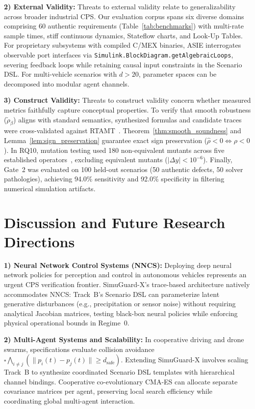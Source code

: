 \documentclass[journal]{IEEEtran}
\begin{document}
\noindent\textbf{2) External Validity:}
Threats to external validity relate to generalizability across broader industrial CPS. Our evaluation corpus spans six diverse domains comprising 60 authentic requirements (Table~\ref{tab:benchmarks}) with multi-rate sample times, stiff continuous dynamics, Stateflow charts, and Look-Up Tables. For proprietary subsystems with compiled C/MEX binaries, ASIE interrogates observable port interfaces via \texttt{Simulink.BlockDiagram.getAlgebraicLoops}, severing feedback loops while retaining causal input constraints in the Scenario DSL. For multi-vehicle scenarios with $d > 20$, parameter spaces can be decomposed into modular agent channels.

\noindent\textbf{3) Construct Validity:}
Threats to construct validity concern whether measured metrics faithfully capture conceptual properties. To verify that smooth robustness ($\tilde{\rho}_\beta$) aligns with standard semantics, synthesized formulas and candidate traces were cross-validated against RTAMT~\cite{nickovic2020rtamt}. Theorem~\ref{thm:smooth_soundness} and Lemma~\ref{lem:sign_preservation} guarantee exact sign preservation ($\hat{\rho} < 0 \iff \rho < 0$). In RQ10, mutation testing used 180 non-equivalent mutants across five established operators~\cite{zhan2005mutation}, excluding equivalent mutants ($|\Delta y| < 10^{-6}$). Finally, Gate~2 was evaluated on 100 held-out scenarios (50 authentic defects, 50 solver pathologies), achieving 94.0\% sensitivity and 92.0\% specificity in filtering numerical simulation artifacts.

\section{Discussion and Future Research Directions}
\label{sec:discussion}
\noindent\textbf{1) Neural Network Control Systems (NNCS):}
Deploying deep neural network policies for perception and control in autonomous vehicles represents an urgent CPS verification frontier. SimuGuard-X's trace-based architecture natively accommodates NNCS: Track~B's Scenario DSL can parameterize latent generative disturbances (e.g., precipitation or sensor noise) without requiring analytical Jacobian matrices, testing black-box neural policies while enforcing physical operational bounds in Regime~0.

\noindent\textbf{2) Multi-Agent Systems and Scalability:}
In cooperative driving and drone swarms, specifications evaluate collision avoidance $\square \bigwedge_{i \neq j} ( \|p_i(t) - p_j(t)\| \ge d_{\mathrm{safe}} )$. Extending SimuGuard-X involves scaling Track~B to synthesize coordinated Scenario DSL templates with hierarchical channel bindings. Cooperative co-evolutionary CMA-ES can allocate separate covariance matrices per agent, preserving local search efficiency while coordinating global multi-agent interaction.
\end{document}
